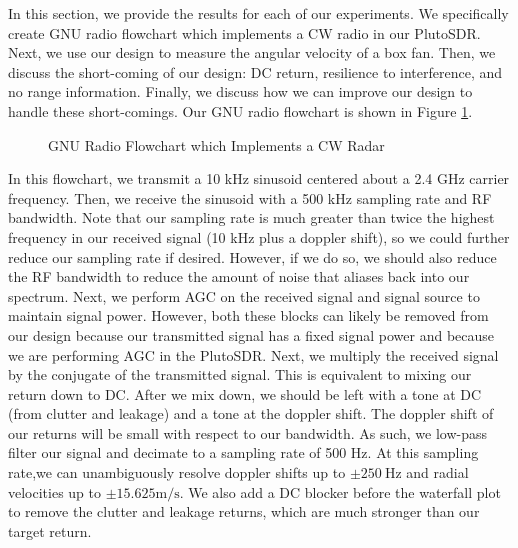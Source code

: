 \documentclass{article}
\begin{document}
In this section, we provide the results for each of our experiments. We specifically create GNU radio flowchart which implements a CW radio in our PlutoSDR. Next, we use our design to measure the angular velocity of a box fan. Then, we discuss the short-coming of our design: DC return, resilience to interference, and no range information. Finally, we discuss how we can improve our design to handle these short-comings. Our GNU radio flowchart is shown in Figure \ref{fig::gnu_radio_block_diagram}. 

\begin{figure}[H]
    	\centering
    	\caption{GNU Radio Flowchart which Implements a CW Radar}
    	\label{fig::gnu_radio_block_diagram}
\end{figure}

\noindent In this flowchart, we transmit a 10 kHz sinusoid centered about a 2.4 GHz carrier frequency. Then, we receive the sinusoid with a 500 kHz sampling rate and RF bandwidth. Note that our sampling rate is much greater than twice the highest frequency in our received signal (10 kHz plus a doppler shift), so we could further reduce our sampling rate if desired. However, if we do so, we should also reduce the RF bandwidth to reduce the amount of noise that aliases back into our spectrum. Next, we perform AGC on the received signal and signal source to maintain signal power. However, both these blocks can likely be removed from our design because our transmitted signal has a fixed signal power and because we are performing AGC in the PlutoSDR. Next, we multiply the received signal by the conjugate of the transmitted signal. This is equivalent to mixing our return down to DC. After we mix down, we should be left with a tone at DC (from clutter and leakage) and a tone at the doppler shift. The doppler shift of our returns will be small with respect to our bandwidth. As such, we low-pass filter our signal and decimate to a sampling rate of 500 Hz. At this sampling rate,we can unambiguously resolve doppler shifts up to $\pm 250\ \text{Hz}$ and radial velocities up to $\pm 15.625 \text{m}/\text{s}$. We also add a DC blocker before the waterfall plot to remove the clutter and leakage returns, which are much stronger than our target return.
\end{document}
